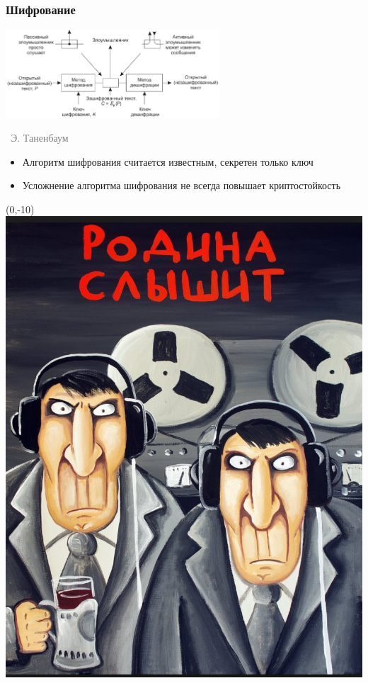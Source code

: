 \documentclass[xetex,mathserif,serif]{beamer}
\newcommand{\attribution}[1] {
\vspace{-5mm}\begin{flushright}\begin{scriptsize}\textcolor{gray}{\textcopyright\, #1}\end{scriptsize}\end{flushright}
}
\begin{document}
    \begin{frame}
        \frametitle{Шифрование}
        \begin{center}
            \includegraphics[width=0.6\textwidth]{cryptography.png}
            \attribution{Э. Таненбаум}
        \end{center}
        \begin{itemize}
            \item Алгоритм шифрования считается известным, секретен только ключ
            \item Усложнение алгоритма шифрования не всегда повышает криптостойкость
        \end{itemize}
        \begin{textblock}{2.5}(0,-10)
            \includegraphics[width=\textwidth]{youAreBeingWatched.png}
        \end{textblock}
    \end{frame}
\end{document}

